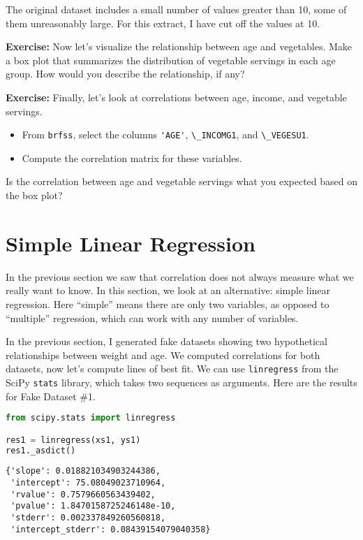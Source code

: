 The original dataset includes a small number of values greater than 10,
some of them unreasonably large. For this extract, I have cut off the
values at 10.

\textbf{Exercise:} Now let's visualize the relationship between age and
vegetables. Make a box plot that summarizes the distribution of
vegetable servings in each age group. How would you describe the
relationship, if any?

\textbf{Exercise:} Finally, let's look at correlations between age,
income, and vegetable servings.

\begin{itemize}

\item
  From \passthrough{\lstinline!brfss!}, select the columns
  \passthrough{\lstinline!'AGE'!}, \passthrough{\lstinline!\_INCOMG1!},
  and \passthrough{\lstinline!\_VEGESU1!}.
\item
  Compute the correlation matrix for these variables.
\end{itemize}

Is the correlation between age and vegetable servings what you expected
based on the box plot?

\section{Simple Linear Regression}\label{simple-linear-regression}

In the previous section we saw that correlation does not always measure
what we really want to know. In this section, we look at an alternative:
simple linear regression. Here ``simple'' means there are only two
variables, as opposed to ``multiple'' regression, which can work with
any number of variables.

In the previous section, I generated fake datasets showing two
hypothetical relationships between weight and age. We computed
correlations for both datasets, now let's compute lines of best fit. We
can use \passthrough{\lstinline!linregress!} from the SciPy
\passthrough{\lstinline!stats!} library, which takes two sequences as
arguments. Here are the results for Fake Dataset \#1.

\begin{lstlisting}[language=Python,style=source]
from scipy.stats import linregress

res1 = linregress(xs1, ys1)
res1._asdict()
\end{lstlisting}

\begin{lstlisting}[style=output]
{'slope': 0.018821034903244386,
 'intercept': 75.08049023710964,
 'rvalue': 0.7579660563439402,
 'pvalue': 1.8470158725246148e-10,
 'stderr': 0.002337849260560818,
 'intercept_stderr': 0.08439154079040358}
\end{lstlisting}

